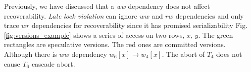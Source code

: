 \documentclass[conference]{IEEEtran}
\begin{document}
Previously, we have discussed that a \emph{ww} dependency does not affect recoverability.
\emph{Late lock violation} can ignore ${ww}$ and ${rw}$ dependencies and only trace ${wr}$ dependencies for recoverability since it has promised serializability
Fig.   \ref{fig:versions_example} shows a series of access on two rows, ${x}$, ${y}$.
The green rectangles are speculative versions.
The red ones are committed versions.
Although there is ${ww}$ dependency ${w_6[x] \rightarrow w_4[x]}$.
The abort of $T_4$ does not cause ${T_6}$ cascade abort.
\begin{figure}[htbp]
  \centering
\end{figure}
\end{document}
